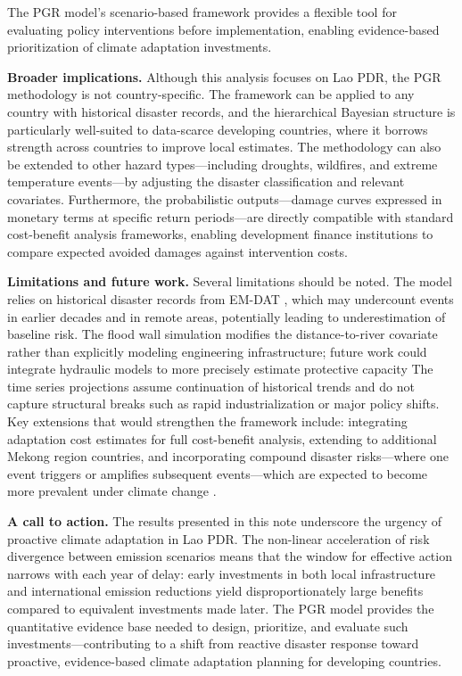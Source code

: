 \documentclass[11pt,a4paper]{article}
\begin{document}
The PGR model's scenario-based framework provides a flexible tool for evaluating policy interventions before implementation, enabling evidence-based prioritization of climate adaptation investments.

\textbf{Broader implications.} Although this analysis focuses on Lao PDR, the PGR methodology is not country-specific. The framework can be applied to any country with historical disaster records, and the hierarchical Bayesian structure is particularly well-suited to data-scarce developing countries, where it borrows strength across countries to improve local estimates. The methodology can also be extended to other hazard types---including droughts, wildfires, and extreme temperature events---by adjusting the disaster classification and relevant covariates. Furthermore, the probabilistic outputs---damage curves expressed in monetary terms at specific return periods---are directly compatible with standard cost-benefit analysis frameworks, enabling development finance institutions to compare expected avoided damages against intervention costs.

\textbf{Limitations and future work.} Several limitations should be noted. The model relies on historical disaster records from EM-DAT \cite{emdat2024}, which may undercount events in earlier decades and in remote areas, potentially leading to underestimation of baseline risk. The flood wall simulation modifies the distance-to-river covariate rather than explicitly modeling engineering infrastructure; future work could integrate hydraulic models to more precisely estimate protective capacity The time series projections assume continuation of historical trends and do not capture structural breaks such as rapid industrialization or major policy shifts. Key extensions that would strengthen the framework include: integrating adaptation cost estimates for full cost-benefit analysis, extending to additional Mekong region countries, and incorporating compound disaster risks---where one event triggers or amplifies subsequent events---which are expected to become more prevalent under climate change \cite{ipcc2023ar6}.


\textbf{A call to action.} The results presented in this note underscore the urgency of proactive climate adaptation in Lao PDR. The non-linear acceleration of risk divergence between emission scenarios means that the window for effective action narrows with each year of delay: early investments in both local infrastructure and international emission reductions yield disproportionately large benefits compared to equivalent investments made later. The PGR model provides the quantitative evidence base needed to design, prioritize, and evaluate such investments---contributing to a shift from reactive disaster response toward proactive, evidence-based climate adaptation planning for developing countries.
\end{document}
